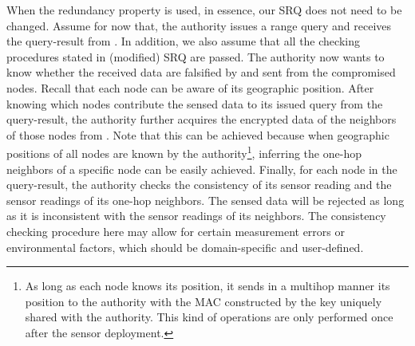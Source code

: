 \documentclass[conference]{IEEEtran}
\begin{document}
When the redundancy property is used, in essence, our SRQ does not need to be changed. Assume for now that, the authority issues a range query and receives the query-result from . In addition, we also assume that all the checking procedures stated in (modified) SRQ are passed. The authority now wants to know whether the received data are falsified by and sent from the compromised nodes. Recall that each node can be aware of its geographic position. After knowing which nodes contribute the sensed data to its issued query from the query-result, the authority further acquires the encrypted data of the neighbors of those nodes from . Note that this can be achieved because when geographic positions of all nodes are known by the authority\footnote{As long as each node knows its position, it sends in a multihop manner its position to the authority with the MAC constructed by the key uniquely shared with the authority. This kind of operations are only performed once after the sensor deployment.}, inferring the one-hop neighbors of a specific node can be easily achieved. Finally, for each node in the query-result, the authority checks the consistency of its sensor reading and the sensor readings of its one-hop neighbors. The sensed data will be rejected as long as it is inconsistent with the sensor readings of its neighbors. The consistency checking procedure here may allow for certain measurement errors or environmental factors, which should be domain-specific and user-defined. 
\end{document}
